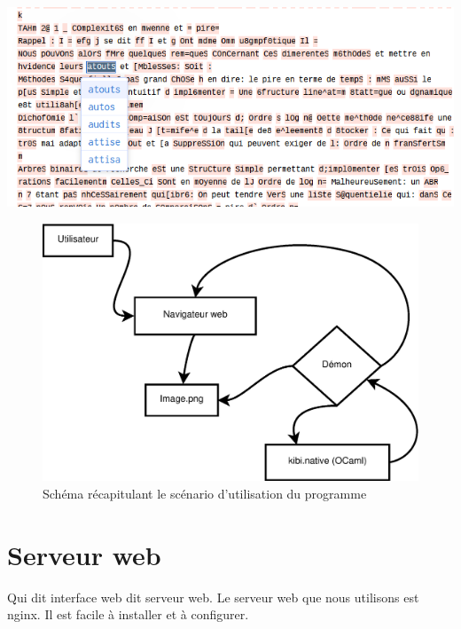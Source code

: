 \begin{enumerate}
    \begin{center}
      \includegraphics[scale=0.55]{chapters/Pictures/toogy/guy-robert.png}
    \end{center}
\end{enumerate}

\begin{figure}[h!]
  \centering
  \includegraphics[scale=0.4]{chapters/Pictures/toogy/guy-scenario.eps}
  \caption{Schéma récapitulant le scénario d'utilisation du programme}
\end{figure}

\section{Serveur web}

Qui dit interface web dit serveur web. Le serveur web que nous utilisons est
nginx. Il est facile à installer et à configurer.

